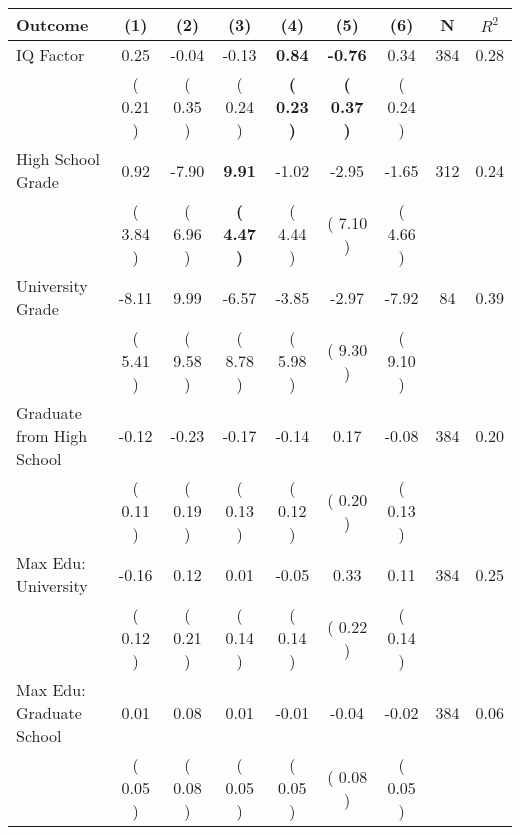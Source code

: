 \begin{tabular}{lcccccccc}
\toprule
 \textbf{Outcome} & \textbf{(1)} & \textbf{(2)} & \textbf{(3)} & \textbf{(4)} & \textbf{(5)} & \textbf{(6)} & \textbf{N} & \textbf{$ R^2$} \\
\midrule
IQ Factor &      0.25 &     -0.04 &     -0.13 & \textbf{     0.84} & \textbf{    -0.76} &      0.34 & 384 &       0.28 \\ 
 & (     0.21 ) & (     0.35 ) & (     0.24 ) & \textbf{(     0.23 )} & \textbf{(     0.37 )} & (     0.24 ) & \\
High School Grade &      0.92 &     -7.90 & \textbf{     9.91} &     -1.02 &     -2.95 &     -1.65 & 312 &       0.24 \\ 
 & (     3.84 ) & (     6.96 ) & \textbf{(     4.47 )} & (     4.44 ) & (     7.10 ) & (     4.66 ) & \\
University Grade &     -8.11 &      9.99 &     -6.57 &     -3.85 &     -2.97 &     -7.92 & 84 &       0.39 \\ 
 & (     5.41 ) & (     9.58 ) & (     8.78 ) & (     5.98 ) & (     9.30 ) & (     9.10 ) & \\
Graduate from High School &     -0.12 &     -0.23 &     -0.17 &     -0.14 &      0.17 &     -0.08 & 384 &       0.20 \\ 
 & (     0.11 ) & (     0.19 ) & (     0.13 ) & (     0.12 ) & (     0.20 ) & (     0.13 ) & \\
Max Edu: University &     -0.16 &      0.12 &      0.01 &     -0.05 &      0.33 &      0.11 & 384 &       0.25 \\ 
 & (     0.12 ) & (     0.21 ) & (     0.14 ) & (     0.14 ) & (     0.22 ) & (     0.14 ) & \\
Max Edu: Graduate School &      0.01 &      0.08 &      0.01 &     -0.01 &     -0.04 &     -0.02 & 384 &       0.06 \\ 
 & (     0.05 ) & (     0.08 ) & (     0.05 ) & (     0.05 ) & (     0.08 ) & (     0.05 ) & \\
\bottomrule
\end{tabular}

